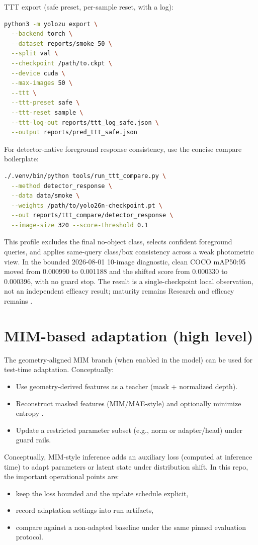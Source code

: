 TTT export (safe preset, per-sample reset, with a log):
\begin{lstlisting}[language=bash]
python3 -m yolozu export \
  --backend torch \
  --dataset reports/smoke_50 \
  --split val \
  --checkpoint /path/to.ckpt \
  --device cuda \
  --max-images 50 \
  --ttt \
  --ttt-preset safe \
  --ttt-reset sample \
  --ttt-log-out reports/ttt_log_safe.json \
  --output reports/pred_ttt_safe.json
\end{lstlisting}

For detector-native foreground response consistency, use the concise compare
boilerplate:
\begin{lstlisting}[language=bash]
./.venv/bin/python tools/run_ttt_compare.py \
  --method detector_response \
  --data data/smoke \
  --weights /path/to/yolo26n-checkpoint.pt \
  --out reports/ttt_compare/detector_response \
  --image-size 320 --score-threshold 0.1
\end{lstlisting}
This profile excludes the final no-object class, selects confident foreground
queries, and applies same-query class/box consistency across a weak photometric
view.  In the bounded 2026-08-01 10-image diagnostic, clean COCO mAP50:95 moved
from 0.000990 to 0.001188 and the shifted score from 0.000330 to 0.000396, with
no guard stop.  The result is a single-checkpoint local observation, not an
independent efficacy result; maturity remains Research and efficacy remains
\cmd{not\_established}.

\section{MIM-based adaptation (high level)}
The geometry-aligned MIM branch (when enabled in the model) can be used for test-time adaptation.
Conceptually:
\begin{itemize}
  \item Use geometry-derived features as a teacher (mask + normalized depth).
  \item Reconstruct masked features (MIM/MAE-style) \cite{he2022mae,xie2022simmim} and optionally minimize entropy \cite{grandvalet2005entropy}.
  \item Update a restricted parameter subset (e.g., norm or adapter/head) under guard rails.
\end{itemize}

Conceptually, MIM-style inference adds an auxiliary loss (computed at inference time) to adapt parameters or latent state under distribution shift.
In this repo, the important operational points are:
\begin{itemize}
  \item keep the loss bounded and the update schedule explicit,
  \item record adaptation settings into run artifacts,
  \item compare against a non-adapted baseline under the same pinned evaluation protocol.
\end{itemize}

